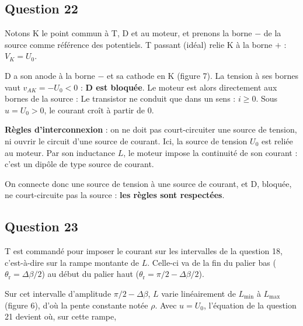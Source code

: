 \documentclass[11pt,a4paper]{article}
\newcommand{\equationajustee}[1]{%
  \sbox{\boiteequation}{$\displaystyle #1$}%
  \ifdim\wd\boiteequation>\linewidth
    \[\resizebox{\linewidth}{!}{\usebox{\boiteequation}}\]%
  \else
    \[#1\]%
  \fi}
\begin{document}
\hypertarget{question-22}{%
\subsection{Question 22}\label{question-22}}

Notons K le point commun à T, D et au moteur, et prenons la borne \(-\) de la source comme référence des potentiels. T passant (idéal) relie K à la borne \(+\) : \(V_K=U_0\).

D a son anode à la borne \(-\) et sa cathode en K (figure 7). La tension à ses bornes vaut \(v_{AK}=-U_0<0\) : \textbf{D est bloquée}. Le moteur est alors directement aux bornes de la source :
\equationajustee{\boxed{u=U_0}}
Le transistor ne conduit que dans un sens : \textbf{\(i\ge0\)}. Sous \(u=U_0>0\), le courant croît à partir de \(0\).

\textbf{Règles d'interconnexion} : on ne doit pas court-circuiter une source de tension, ni ouvrir le circuit d'une source de courant. Ici, la source de tension \(U_0\) est reliée au moteur. Par son inductance \(L\), le moteur impose la continuité de son courant : c'est un dipôle de type source de courant.

On connecte donc une source de tension à une source de courant, et D, bloquée, ne court-circuite pas la source : \textbf{les règles sont respectées}.

\hypertarget{question-23}{%
\subsection{Question 23}\label{question-23}}

T est commandé pour imposer le courant sur les intervalles de la question 18, c'est-à-dire sur la rampe montante de \(L\). Celle-ci va de la fin du palier bas (\(\theta_{\mathrm r}=\Delta\beta/2\)) au début du palier haut (\(\theta_{\mathrm r}=\pi/2-\Delta\beta/2\)).

Sur cet intervalle d'amplitude \(\pi/2-\Delta\beta\), \(L\) varie linéairement de \(L_{\min}\) à \(L_{\max}\) (figure 6), d'où la pente constante
\equationajustee{\frac{\mathrm dL}{\mathrm d\theta_{\mathrm r}}=\frac{L_{\max}-L_{\min}}{\pi/2-\Delta\beta}}
notée \(\rho\). Avec \(u=U_0\), l'équation de la question 21 devient
\equationajustee{\boxed{(r+\Omega\rho)\,i+\Omega L(\theta_{\mathrm r})\frac{\mathrm di}{\mathrm d\theta_{\mathrm r}}=U_0}}
où, sur cette rampe,
\equationajustee{L(\theta_{\mathrm r})=L_{\min}+\rho\Big(\theta_{\mathrm r}-\frac{\Delta\beta}{2}\Big)}
\end{document}
